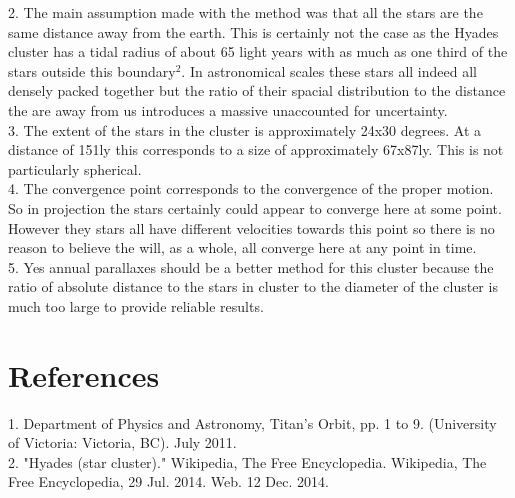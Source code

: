 \documentclass{article}
\begin{document}
2. The main assumption made with the method was that all the stars are the same distance away from the earth. This is certainly not the case as the Hyades cluster has a tidal radius of about 65 light years with as much as one third of the stars outside this boundary$^2$. In astronomical scales these stars all indeed all densely packed together but the ratio of their spacial distribution to the distance the are away from us introduces a massive unaccounted for uncertainty.\\

3. The extent of the stars in the cluster is approximately 24x30 degrees. At a distance of 151ly this corresponds to a size of approximately 67x87ly. This is not particularly spherical.\\

4. The convergence point corresponds to the convergence of the proper motion. So in projection the stars certainly could appear to converge here at some point. However they stars all have different velocities towards this point so there is no reason to believe the will, as a whole, all converge here at any point in time.\\

5. Yes annual parallaxes should be a better method for this cluster because the ratio of absolute distance to the stars in cluster to the diameter of the cluster is much too large to provide reliable results.

\section{References}
1. Department of Physics and Astronomy, Titan's Orbit, pp. 1 to 9. (University of Victoria: Victoria, BC). July 2011.\\
2. "Hyades (star cluster)." Wikipedia, The Free Encyclopedia. Wikipedia, The Free Encyclopedia, 29 Jul. 2014. Web. 12 Dec. 2014. 
\end{document}
